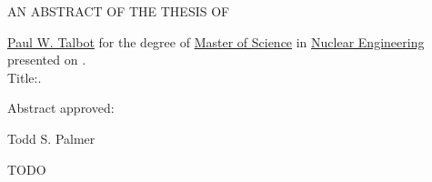 
\begin{center} AN ABSTRACT OF THE THESIS OF  \end{center}

\thispagestyle{empty}

\belowSecSkip

\ResetSingleSpace

\noindent \underline{Paul W. Talbot} for the degree of 
	  \underline{Master of Science} in
	  \underline{Nuclear Engineering} presented on 
	  \underline{\myDefenseDate}. \\
	  Title:\hfill\underline{\myTitleName}.

\vskip0.3in

\noindent Abstract approved: \hspace{0.25in} \hrulefill\




	  
\noindent \hspace{3.25in} Todd S. Palmer \hfill

\vskip0.25in



\ResetDoubleSpace

\noindent 
	\indent TODO

\thispagestyle{empty}
